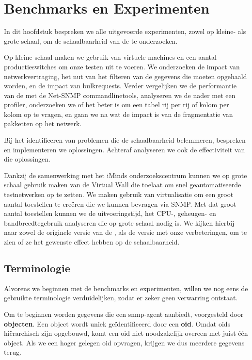 \chapter{Benchmarks en Experimenten}

In dit hoofdstuk bespreken we alle uitgevoerde experimenten, zowel op kleine- als grote schaal, om de schaalbaarheid van de \nwmretriever{} te onderzoeken.

Op kleine schaal maken we gebruik van virtuele machines en een aantal productieswitches om onze testen uit te voeren.
We onderzoeken de impact van netwerkvertraging, het nut van het filteren van de gegevens die moeten opgehaald worden, en de impact van bulkrequests.
Verder vergelijken we de performantie van de \nwmretriever{} met de Net-SNMP commandlinetools,
analyseren we de \nwmretriever{} nader met een profiler, onderzoeken we of het beter is om een tabel rij per rij of kolom per kolom op te vragen,
en gaan we na wat de impact is van de fragmentatie van pakketten op het netwerk.

Bij het identificeren van problemen die de schaalbaarheid belemmeren, bespreken en implementeren we oplossingen.
Achteraf analyseren we ook de effectiviteit van die oplossingen.

Dankzij de samenwerking met het iMinds onderzoekscentrum kunnen we op grote schaal gebruik maken van de Virtual Wall die toelaat om snel geautomatiseerde testnetwerken op te zetten.
We maken gebruik van virtualisatie om een groot aantal toestellen te creëren die we kunnen bevragen via SNMP.
Met dat groot aantal toestellen kunnen we de uitvoeringstijd, het CPU-, geheugen- en bandbreedtegebruik analyseren die op grote schaal nodig is.
We kijken hierbij naar zowel de originele versie van de \nwmretriever{}, als de versie met onze verbeteringen,
om te zien of ze het gewenste effect hebben op de schaalbaarheid.


\section{Terminologie}

Alvorens we beginnen met de benchmarks en experimenten, willen we nog eens de gebruikte terminologie verduidelijken, zodat er zeker geen verwarring ontstaat.

Om te beginnen worden gegevens die een \gls{snmp-agent} aanbiedt, voorgesteld door \textbf{objecten}.
Een object wordt uniek geïdentificeerd door een \textbf{\gls{oid}}.
Omdat \glspl{oid} hiërarchisch zijn opgebouwd, komt een \gls{oid} niet noodzakelijk overeen met juist één object.
Als we een hoger gelegen \gls{oid} opvragen, krijgen we dus meerdere gegevens terug.

